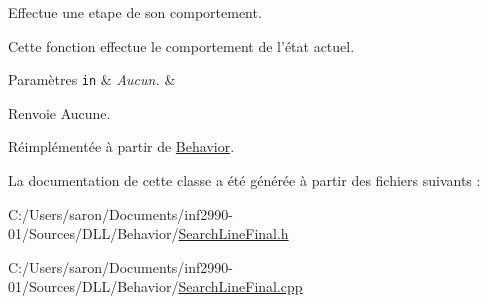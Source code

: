 Effectue une etape de son comportement. 

Cette fonction effectue le comportement de l'état actuel.


\begin{DoxyParams}[1]{Paramètres}
\mbox{\tt in}  & {\em Aucun.} & \\
\hline
\end{DoxyParams}
\begin{DoxyReturn}{Renvoie}
Aucune. 
\end{DoxyReturn}


Réimplémentée à partir de \hyperlink{group__inf2990_gac22f205bc85075ff707ad1f695c18439}{Behavior}.



La documentation de cette classe a été générée à partir des fichiers suivants \-:\begin{DoxyCompactItemize}
\item 
C\-:/\-Users/saron/\-Documents/inf2990-\/01/\-Sources/\-D\-L\-L/\-Behavior/\hyperlink{_search_line_final_8h}{Search\-Line\-Final.\-h}\item 
C\-:/\-Users/saron/\-Documents/inf2990-\/01/\-Sources/\-D\-L\-L/\-Behavior/\hyperlink{_search_line_final_8cpp}{Search\-Line\-Final.\-cpp}\end{DoxyCompactItemize}
